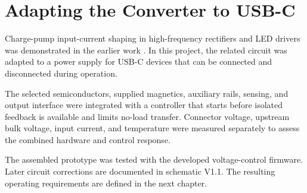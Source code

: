 \section{Adapting the Converter to USB-C}
\label{sec:bg-gap}

Charge-pump input-current shaping in high-frequency rectifiers and LED drivers was demonstrated in the earlier work \cite{ammar2020chargepump,ammar2021led}. In this project, the related circuit was adapted to a power supply for USB-C devices that can be connected and disconnected during operation.

The selected semiconductors, supplied magnetics, auxiliary rails, sensing, and output interface were integrated with a controller that starts before isolated feedback is available and limits no-load transfer. Connector voltage, upstream bulk voltage, input current, and temperature were measured separately to assess the combined hardware and control response.

The assembled prototype was tested with the developed voltage-control firmware. Later circuit corrections are documented in schematic V1.1. The resulting operating requirements are defined in the next chapter.
